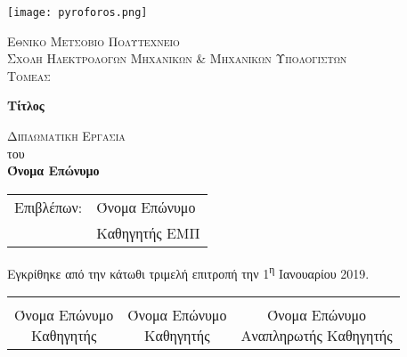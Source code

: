 \begin{titlepage}
	
	\begin{center}
	
	\vspace*{-1cm}

    \texttt{[image: pyroforos.png]}
        
    \Large
    \textsc{Εθνικο Μετσοβιο Πολυτεχνειο}\\
    \large
    \textsc{Σχολη Ηλεκτρολογων Μηχανικων \& Μηχανικων Υπολογιστων}\\
    \textsc{Τομεας}
    
    \vspace{1.5cm}
	
	\Huge
    \textbf{Τίτλος}
        
    \vspace{1.5cm}
    \Large
    \textsc{Διπλωματικη Εργασια}\\
    του\\

    \LARGE
    \textbf{Όνομα Επώνυμο}
    
    \vfill
    \end{center}
    
    \begin{tabular}{ll}
		Επιβλέπων: & Όνομα Επώνυμο \\
		 & Καθηγητής ΕΜΠ
	\end{tabular}
	
	\vspace{1.5cm}
    
    Εγκρίθηκε από την κάτωθι τριμελή επιτροπή την 1\textsuperscript{η} Ιανουαρίου 2019.
    
    \vspace{1.5cm}
	
	\begin{center}
	\noindent\begin{tabular}{ccc}
		\makebox[0.3\textwidth]{\hrulefill} & 
		\makebox[0.3\textwidth]{\hrulefill} & 
		\makebox[0.3\textwidth]{\hrulefill} \\

		\specialcell{Όνομα Επώνυμο \\ Καθηγητής} & 
		\specialcell{Όνομα Επώνυμο \\ Καθηγητής} & 
		\specialcell{Όνομα Επώνυμο \\ Αναπληρωτής Καθηγητής} \\ [8ex]%
	\end{tabular}
	\end{center}
	
\end{titlepage}